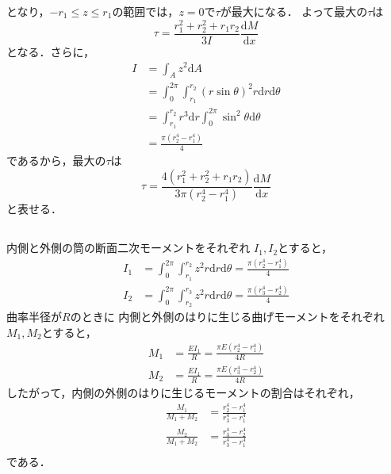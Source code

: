 \documentclass[a4paper]{jsarticle}
\begin{document}
となり，$-r_1 \leq z \leq r_1$の範囲では，$z = 0$で$\tau$が最大になる．
よって最大の$\tau$は
\begin{equation}
  \tau = \frac{r_1^2 + r_2^2 + r_1 r_2}{3 I}\frac{\mathrm{d}M}{\mathrm{d}x}
\end{equation}
となる．さらに，
\begin{equation}
  \begin{aligned}
    I & = \int_A z^2 \mathrm{d}A                       \\
      & = \int_0^{2\pi} \int_{r_1}^{r_2}
    (r \sin \theta)^2 r \mathrm{d} r \mathrm{d} \theta \\
      & = \int_{r_1}^{r_2} r^3 \mathrm{d} r
    \int_0^{2 \pi} \sin^2 \theta \mathrm{d} \theta     \\
      & = \frac{\pi(r_2^4 - r_1^4)}{4}
  \end{aligned}
\end{equation}
であるから，最大の$\tau$は
\begin{equation}
  \tau = \frac{4(r_1^2 + r_2^2 + r_1 r_2)}{3 \pi (r_2^4 - r_1^4)}
  \frac{\mathrm{d} M}{\mathrm{d} x}
\end{equation}
と表せる．

\subsection{}
\subsubsection{}
内側と外側の筒の断面二次モーメントをそれぞれ
$I_1, I_2$とすると，
\begin{align}
  I_1 & = \int_0^{2\pi} \int_{r_1}^{r_2} z^2 r \mathrm{d} r \mathrm{d} \theta
  = \frac{\pi (r_2^4 - r_1^4)}{4}                                             \\
  I_2 & = \int_0^{2\pi} \int_{r_2}^{r_3} z^2 r \mathrm{d} r \mathrm{d} \theta
  = \frac{\pi (r_3^4 - r_2^4)}{4}
\end{align}
曲率半径が$R$のときに
内側と外側のはりに生じる曲げモーメントをそれぞれ
$M_1, M_2$とすると，
\begin{align}
  M_1 & = \frac{E I_1}{R} = \frac{\pi E (r_2^4 - r_1^4)}{4 R} \\
  M_2 & = \frac{E I_1}{R} = \frac{\pi E (r_3^4 - r_2^4)}{4 R}
\end{align}
したがって，内側の外側のはりに生じるモーメントの割合はそれぞれ，
\begin{align}
  \frac{M_1}{M_1 + M_2} & = \frac{r_2^4 - r_1^4}{r_3^4 - r_1^4} \\
  \frac{M_2}{M_1 + M_2} & = \frac{r_3^4 - r_2^4}{r_3^4 - r_1^4} \\
\end{align}
である．
\end{document}
